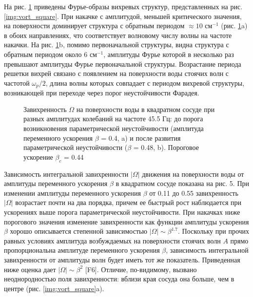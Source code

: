 На рис. \ref{img:fft_square} приведены Фурье-образы вихревых структур, представленных на рис. \ref{img:vort_square}. При накачке с амплитудой, меньшей критического значения, на поверхности доминирует структура с обратным периодом $\approx 10$ см$^{-1}$ (рис. \ref{img:fft_square}a) в обоих направлениях, что соответствует волновому числу волны на частоте накачки. На рис. \ref{img:fft_square}b, помимо первоначальной структуры, видна структура с обратным периодом около 6 см$^{-1}$, амплитуды Фурье которой в несколько раз превышают амплитуды Фурье первоначальной структуры. Возрастание периода решетки вихрей связано с появлением на поверхности воды стоячих волн с частотой $\omega_p/2$, длина волны которых совпадает с периодом вихревой структуры, возникающей при переходе через порог неустойчивости Фарадея. 

\begin{figure}[ht]
  \begin{minipage}[ht]{0.49\linewidth}
  \end{minipage}
  \hfill
  \begin{minipage}[ht]{0.49\linewidth}
  \end{minipage}
  \caption{Завихренность $\Omega$ на поверхности воды в квадратном сосуде при разных амплитудах колебаний на частоте 45.5 Гц: до порога возникновения параметрической неустойчивости (амплитуда переменного ускорения $\beta$ = 0.4, a) и после развития параметрической неустойчивости ($\beta$ = 0.48, b). Пороговое ускорение $\beta_c$ = 0.44}
  \label{img:fft_square}  
\end{figure}

Зависимость интегральной завихренности $|\Omega|$ движения на поверхности воды от амплитуды переменного ускорения $\beta$ в квадратном сосуде показана на рис. 5. При изменении амплитуды переменного ускорения $\beta$ от 0.11 до 0.55 завихренность $|\Omega|$ возрастает почти на два порядка, причем ее быстрый рост наблюдается при ускорениях выше порога параметрической неустойчивости. При накачках ниже порогового значения изменение завихренности как функции амплитуды ускорения $\beta$ хорошо описывается степенной зависимостью $|\Omega| \sim \beta^{1.7}$. Поскольку при прочих равных условиях амплитуда возбуждаемых на поверхности стоячих волн $A$ прямо пропорциональна амплитуде переменного ускорения $\beta$, зависимость интегральной завихренности от амплитуды волн будет иметь тот же показатель. Приведенная ниже оценка дает $|\Omega| \sim \beta^{2}$ [F6]. Отличие, по-видимому, вызвано неоднородностью поля завихренности: вблизи края сосуда она больше, чем в центре (рис. \ref{img:vort_square}a).

